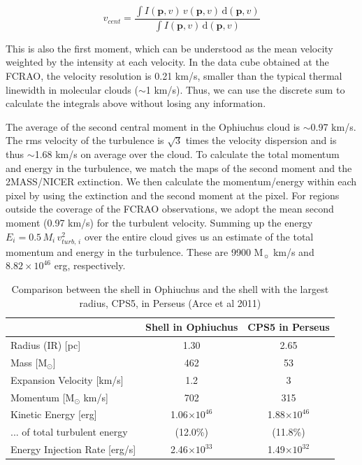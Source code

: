 \documentclass[11pt,a4paper]{emulateapj}
\begin{document}
\begin{equation}
v_{cent} = \frac{\int{I(\mathbf{p}, v)\,v(\mathbf{p}, v)\,\text{d}(\mathbf{p}, v)}}{\int{I(\mathbf{p}, v)\,\text{d}(\mathbf{p}, v)}}
\end{equation}

This is also the first moment, which can be understood as the mean velocity weighted by the intensity at each velocity. In the data cube obtained at the FCRAO, the velocity resolution is 0.21 km/s, smaller than the typical thermal linewidth in molecular clouds ($\sim$1 km/s). Thus, we can use the discrete sum to calculate the integrals above without losing any information.

The average of the second central moment in the Ophiuchus cloud is $\sim$0.97 km/s. The rms velocity of the turbulence is $\sqrt{3}$ times the velocity dispersion and is thus $\sim$1.68 km/s on average over the cloud. To calculate the total momentum and energy in the turbulence, we match the maps of the second moment and the 2MASS/NICER extinction. We then calculate the momentum/energy within each pixel by using the extinction and the second moment at the pixel. For regions outside the coverage of the FCRAO observations, we adopt the mean second moment (0.97 km/s) for the turbulent velocity. Summing up the energy $E_i = 0.5\,M_i\,v_{turb,\,i}^2$ over the entire cloud gives us an estimate of the total momentum and energy in the turbulence. These are 9900 M$_{\sun}$ km/s and $8.82\times10^{46}$ erg, respectively.

\begin{table}[ht]
\centering
\begin{tabular}{lcc}
\hline
& \textbf{Shell in Ophiuchus} & \textbf{CPS5 in Perseus} \\   
\hline
Radius (IR) [pc] & 1.30 & 2.65 \\ 
Mass [M$_{\odot}$] & 462 & 53 \\ 
Expansion Velocity [km/s] & 1.2 & 3 \\ 
Momentum [M$_{\odot}$ km/s]& 702 & 315 \\ 
Kinetic Energy [erg]& 1.06$\times10^{46}$ & 1.88$\times10^{46}$ \\ 
... of total turbulent energy & (12.0\%) & (11.8\%) \\ 
Energy Injection Rate [erg/s] & 2.46$\times10^{33}$ & 1.49$\times10^{32}$ \\
\hline
\end{tabular}
\caption{Comparison between the shell in Ophiuchus and the shell with the largest radius, CPS5, in Perseus (Arce et al 2011)}
\end{table}
\end{document}
